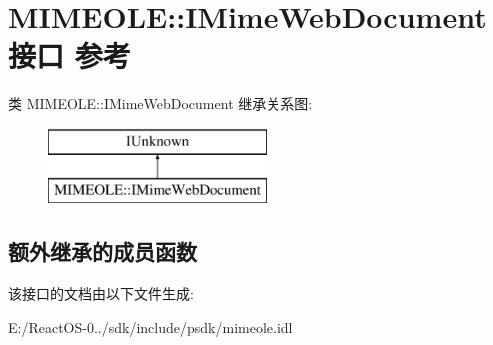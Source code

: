 \hypertarget{interface_m_i_m_e_o_l_e_1_1_i_mime_web_document}{}\section{M\+I\+M\+E\+O\+LE\+:\+:I\+Mime\+Web\+Document接口 参考}
\label{interface_m_i_m_e_o_l_e_1_1_i_mime_web_document}
类 M\+I\+M\+E\+O\+LE\+:\+:I\+Mime\+Web\+Document 继承关系图\+:\begin{figure}[H]
\begin{center}
\leavevmode
\includegraphics[height=2.000000cm]{interface_m_i_m_e_o_l_e_1_1_i_mime_web_document}
\end{center}
\end{figure}
\subsection*{额外继承的成员函数}


该接口的文档由以下文件生成\+:\begin{DoxyCompactItemize}
\item 
E\+:/\+React\+O\+S-\/0../sdk/include/psdk/mimeole.\+idl\end{DoxyCompactItemize}
